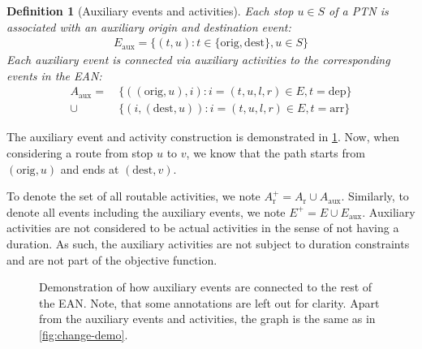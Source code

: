 \documentclass[english, 12pt, a4paper, sci, utf8, a-2b, online]{aaltothesis}
\newtheorem{definition}{Definition}
\newcommand{\Eaux}{E_\text{aux}}
\newcommand{\Ep}{E^+}
\newcommand{\Aaux}{A_\text{aux}}
\newcommand{\Ar}{A_\text{r}}
\newcommand{\Arp}{A_\text{r}^+}
\begin{document}
\begin{definition}[Auxiliary events and activities]
    Each stop $u \in S$ of a PTN is associated with an auxiliary origin and destination event: \begin{align*}
        \Eaux = \{(t, u) : t \in \{\text{orig}, \text{dest}\}, u \in S\}
    \end{align*}
    Each auxiliary event is connected via auxiliary activities to the corresponding events in the EAN:
    \begin{align*}
        \Aaux =\  &\{
            ((\text{orig}, u), i): i = (t, u, l, r) \in E, t = \text{dep}
        \} \\ \cup &\{
            (i, (\text{dest}, u)): i = (t, u, l, r) \in E, t = \text{arr}
        \}
    \end{align*} 
\end{definition}
The auxiliary event and activity construction is demonstrated in \cref{fig:aux-events-demo}. Now, when considering a route from stop $u$ to $v$, we know that the path starts from $(\text{orig}, u)$ and ends at $(\text{dest}, v)$.

To denote the set of all routable activities, we note $\Arp = \Ar \cup \Aaux$. Similarly, to denote all events including the auxiliary events, we note $\Ep = E \cup \Eaux$. Auxiliary activities are not considered to be actual activities in the sense of not having a duration. As such, the auxiliary activities are not subject to duration constraints and are not part of the objective function.



\begin{figure}[b]
    \centering
    
    \caption{Demonstration of how auxiliary events are connected to the rest of the EAN. Note, that some annotations are left out for clarity. Apart from the auxiliary events and activities, the graph is the same as in \cref{fig:change-demo}.}
    \label{fig:aux-events-demo}
\end{figure}
\end{document}
